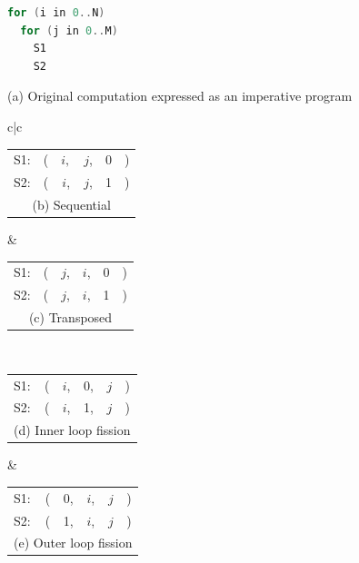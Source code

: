 \begin{figure}
\small

\centering\begin{lstlisting}[language=C,escapechar=@,basicstyle=\linespread{0.9}\small\ttfamily]
for (i in 0..N)
  for (j in 0..M)
    S1
    S2
\end{lstlisting}
(a) Original computation expressed as an imperative program


\begin{tabular}{c|c}
\\\hline
   \begin{tabular}{l@{\hspace{4pt}}r@{\hspace{2pt}}c@{\hspace{2pt}}c@{\hspace{2pt}}c@{\hspace{0pt}}l}
    S1: & ( & $i,$ & $j$, & $0$ & ) \\
    S2: & ( & $i$, & $j$, & 1 & ) \\
    \multicolumn{6}{c}{ (b) Sequential}
   \end{tabular}
     &  
   \begin{tabular}{l@{\hspace{4pt}}r@{\hspace{2pt}}c@{\hspace{2pt}}c@{\hspace{2pt}}c@{\hspace{0pt}}l}
    S1: & ( & $j$, & $i$, & 0 & ) \\
    S2: & ( & $j$, & $i$, & 1 & ) \\
    \multicolumn{6}{c}{ (c) Transposed}
   \end{tabular} \\\hline

    \begin{tabular}{l@{\hspace{4pt}}r@{\hspace{2pt}}c@{\hspace{2pt}}c@{\hspace{2pt}}c@{\hspace{0pt}}l}
    S1: & ( & $i$, & 0, & $j$ & ) \\
    S2: & ( & $i$, & 1, & $j$ & ) \\
    \multicolumn{6}{c}{ (d) Inner loop fission}
   \end{tabular} 
   & 
    \begin{tabular}{l@{\hspace{4pt}}r@{\hspace{2pt}}c@{\hspace{2pt}}c@{\hspace{2pt}}c@{\hspace{0pt}}l}
    S1: & ( & 0, & $i$, & $j$ & ) \\
    S2: & ( & 1, & $i$, & $j$ & ) \\
    \multicolumn{6}{c}{ (e) Outer loop fission}
   \end{tabular} \\\hline
   

\end{tabular}
\end{figure}
